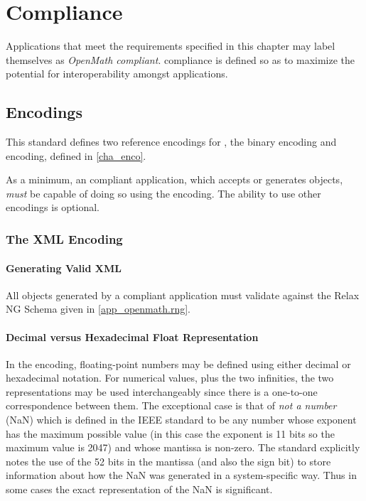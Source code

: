 \chapter{\OM Compliance}\label{cha_comp}

Applications that meet the requirements specified in this chapter may label themselves as
\emph{OpenMath compliant}. \OM compliance is defined so as to maximize the potential for
interoperability amongst \OM applications.

\section{Encodings}\label{sec_compl_encoding}

This standard defines two reference encodings for \OM, the binary encoding and \XML
encoding, defined in \ref{cha_enco}.

As a minimum, an \OM compliant application, which accepts or generates \OM objects,
\emph{must} be capable of doing so using the \XML encoding.  The ability to use other
encodings is optional.


\subsection{The XML Encoding}\label{sec_compl_xml_encoding}

\subsubsection{Generating Valid XML}\label{sec_compl_xml_encoding_val}

All \OM objects generated by a compliant \OM application must validate against the Relax
NG Schema given in \ref{app_openmath.rng}.

\subsubsection{Decimal versus Hexadecimal Float Representation}\label{sec_compl_xml_encoding_float}

In the \XML encoding, floating-point numbers may be defined using either decimal or
hexadecimal notation.  For numerical values, plus the two infinities, the two
representations may be used interchangeably since there is a one-to-one correspondence
between them.  The exceptional case is that of \emph{not a number} (NaN) which is defined
in the IEEE standard \cite{ieee754_85} to be any number whose exponent has the maximum
possible value (in this case the exponent is 11 bits so the maximum value is 2047) and
whose mantissa is non-zero.  The standard explicitly notes the use of the 52 bits in the
mantissa (and also the sign bit) to store information about how the NaN was generated in a
system-specific way.  Thus in some cases the exact representation of the NaN is
significant.

